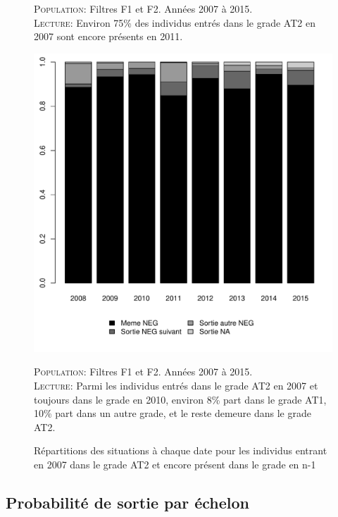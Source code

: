 \documentclass[11pt,a4paper]{article}
\begin{document}
\begin{figure}[ht]
\begin{subfigure}[b]{0.55\linewidth}
    \vspace{4ex}
  \end{subfigure} 
  \begin{minipage}{12cm}
\footnotesize
\textsc{Population:} Filtres F1 et F2. Années 2007 à 2015. \\
\textsc{Lecture:} Environ 75\% des individus entrés dans le grade AT2 en 2007 sont encore présents en 2011. 
\end{minipage}
\end{figure}


\begin{figure}[ht] 
  \caption{Répartitions des situations à chaque date pour les individus entrant en 2007 dans le grade AT2 et encore présent dans le grade en n-1}
  \label{hazard} 
    \centering
    \includegraphics[width=0.75\linewidth]{destination_AT_1.pdf}  
    \begin{minipage}{12cm}
\footnotesize
\textsc{Population:} Filtres F1 et F2. Années 2007 à 2015. \\
\textsc{Lecture:} Parmi les individus entrés dans le grade AT2 en 2007 et toujours dans le grade en 2010, environ 8\% part dans le grade AT1, 10\% part dans un autre grade,  et le reste demeure dans le grade AT2. 
\end{minipage}
\end{figure}




\clearpage
\subsection{Probabilité de sortie par échelon}
\end{document}
